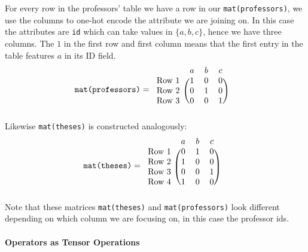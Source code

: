 \documentclass{paper}
\begin{document}
	For every row in the professors' table we have a row in our \texttt{mat(professors)}, we use the columns to one-hot encode the attribute we are joining on. In this case the attributes are \texttt{id} which can take values in $\{a,b,c\}$, hence we have three columns. The $1$ in the first row and first column means that the first entry in the table features $a$ in its ID field.
	\begin{align*}\texttt{mat(professors)} &= 
		\begin{blockarray}{cccc}
			& a & b & c \\
			\begin{block}{c(ccc)}
				\text{Row 1} & 1 & 0 & 0 \\
				\text{Row 2} & 0 & 1 & 0 \\
				\text{Row 3} & 0 & 0 & 1 \\
			\end{block}
		\end{blockarray}
	\end{align*}
	Likewise \texttt{mat(theses)} is constructed analogously:
	\begin{align*}\texttt{mat(theses)} &= 
		\begin{blockarray}{cccc}
			& a & b & c \\
			\begin{block}{c(ccc)}
				\text{Row 1} & 0 & 1 & 0 \\
				\text{Row 2} & 1 & 0 & 0 \\
				\text{Row 3} & 0 & 0 & 1 \\
				\text{Row 4} & 1 & 0 & 0 \\
			\end{block}
		\end{blockarray}
	\end{align*}
	Note that these matrices \texttt{mat(theses)} and \texttt{mat(professors)} look different depending on which column we are focusing on, in this case the professor ids.
	
	\paragraph{Operators as Tensor Operations}
	
\end{document}
